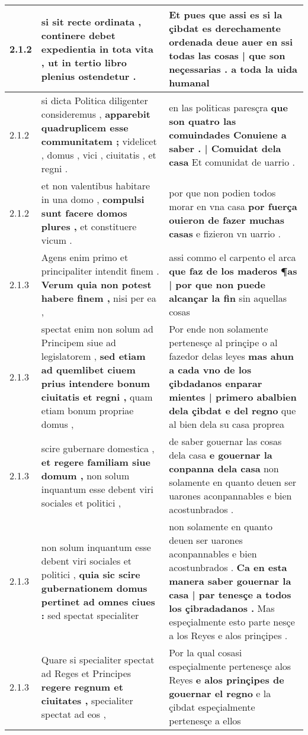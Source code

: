 \begin{tabular}{|p{1cm}|p{6.5cm}|p{6.5cm}|}
2.1.2 & si sit recte ordinata , \textbf{ continere debet expedientia in tota vita , } ut in tertio libro plenius ostendetur . & Et pues que assi es si la çibdat es derechamente ordenada \textbf{ deue auer en ssi todas las cosas | que son neçessarias . } a toda la uida humanal \\\hline
2.1.2 & si dicta Politica diligenter consideremus , \textbf{ apparebit quadruplicem esse communitatem ; } videlicet , domus , vici , ciuitatis , et regni . & en las politicas paresçra \textbf{ que son quatro las comuindades Conuiene a saber . | Comuidat dela casa } Et comunidat de uarrio . \\\hline
2.1.2 & et non valentibus habitare in una domo , \textbf{ compulsi sunt facere domos plures , } et constituere vicum . & por que non podien todos morar en vna casa \textbf{ por fuerça ouieron de fazer muchas casas } e fizieron vn uarrio . \\\hline
2.1.3 & Agens enim primo et principaliter intendit finem . \textbf{ Verum quia non potest habere finem , } nisi per ea , & assi commo el carpento el arca \textbf{ que faz de los maderos ¶as | por que non puede alcançar la fin } sin aquellas cosas \\\hline
2.1.3 & spectat enim non solum ad Principem siue ad legislatorem , \textbf{ sed etiam ad quemlibet ciuem prius intendere bonum ciuitatis et regni , } quam etiam bonum propriae domus , & Por ende non solamente pertenesçe al prinçipe o al fazedor delas leyes \textbf{ mas ahun a cada vno de los çibdadanos enparar mientes | primero abalbien dela çibdat e del regno } que al bien dela su casa proprea \\\hline
2.1.3 & scire gubernare domestica , \textbf{ et regere familiam siue domum , } non solum inquantum esse debent viri sociales et politici , & de saber gouernar las cosas dela casa \textbf{ e gouernar la conpanna dela casa } non solamente en quanto deuen ser uarones aconpannables e bien acostunbrados . \\\hline
2.1.3 & non solum inquantum esse debent viri sociales et politici , \textbf{ quia sic scire gubernationem domus pertinet ad omnes ciues : } sed spectat specialiter & non solamente en quanto deuen ser uarones aconpannables e bien acostunbrados . \textbf{ Ca en esta manera saber gouernar la casa | par tenesçe a todos los çibradadanos . } Mas espeçialmente esto parte nesçe a los Reyes e alos prinçipes . \\\hline
2.1.3 & Quare si specialiter spectat ad Reges et Principes \textbf{ regere regnum et ciuitates , } specialiter spectat ad eos , & Por la qual cosasi espeçialmente pertenesçe alos Reyes \textbf{ e alos prinçipes de gouernar el regno } e la çibdat espeçialmente pertenesçe a ellos \\\hline

\end{tabular}
